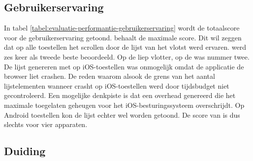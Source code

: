
\subsection{Gebruikerservaring}
\label{sec:evaluatie-gebruikerservaring}

\begin{table}
\centering
{}
\caption{Gebruikerservaring van het scrollen door een lange lijst.}
\label{tabel:evaluatie-performantie-gebruikerservaring}
\end{table}

In tabel \ref{tabel:evaluatie-performantie-gebruikerservaring} wordt de totaalscore voor de gebruikerservaring getoond.
\st{} behaalt de maximale score.
Dit wil zeggen dat op alle toestellen het scrollen door de lijst van \st{} het vlotst werd ervaren.
\jqm{} werd zes keer als tweede beste beoordeeld. 
Op de \htc{} liep \kendo{} vlotter,  op de \ipadi{} was \lungo{} nummer twee.
De lijst genereren met \kendo{} op iOS-toestellen was onmogelijk omdat de applicatie de browser liet crashen.
De reden waarom alsook de grens van het aantal lijstelementen wanneer \kendo{} crasht op iOS-toestellen werd door tijdsbudget niet gecontroleerd.
Een mogelijke denkpiste is dat \kendo{} een overhead genereerd die het maximale toegelaten geheugen voor het iOS-besturingssysteem overschrijdt.
Op Android toestellen kon de \kendo{} lijst echter wel worden getoond.
De score van \kendo{} is dus slechts voor vier apparaten.


\subsection{Duiding}
\label{sec:evaluatie-performantie-duiding}

